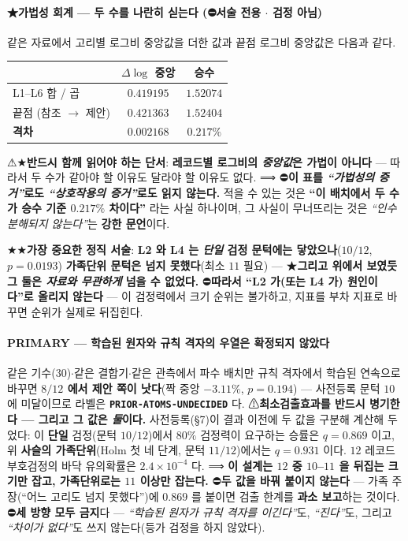 \documentclass[11pt]{report}
\numberwithin{equation}{chapter}
\numberwithin{figure}{chapter}
\numberwithin{table}{chapter}
\begin{document}
\paragraph{★가법성 회계 --- 두 수를 나란히 싣는다 (⛔서술 전용 $\cdot$ 검정 아님)}
같은 자료에서 고리별 로그비 중앙값을 더한 값과 끝점 로그비 중앙값은 다음과 같다.
\begin{center}
\small
\begin{tabular}{lcc}
\toprule
 & $\Delta\log$ 중앙 & 승수 \\
\midrule
L1--L6 합 / 곱 & $0.419195$ & $\mathbf{1.52074}$ \\
끝점 (참조 $\to$ 제안) & $0.421363$ & $\mathbf{1.52404}$ \\
\midrule
\textbf{격차} & $0.002168$ & $\mathbf{0.217\%}$ \\
\bottomrule
\end{tabular}
\end{center}
⚠★\textbf{반드시 함께 읽어야 하는 단서}: \textbf{레코드별 로그비의 \emph{중앙값}은
가법이 아니다} --- 따라서 두 수가 같아야 할 이유도 달라야 할 이유도 없다.
⟹ ⛔\textbf{이 표를 \emph{``가법성의 증거''}로도 \emph{``상호작용의 증거''}로도 읽지
않는다.} 적을 수 있는 것은 \textbf{``이 배치에서 두 수가 승수 기준 $0.217\%$ 차이다''}
라는 사실 하나이며, 그 사실이 무너뜨리는 것은 \emph{``인수분해되지 않는다''}는
\textbf{강한 문언}이다.

★★\textbf{가장 중요한 정직 서술}: \textbf{L2 와 L4 는 \emph{단일} 검정 문턱에는
닿았으나}($10/12$, $p = 0.0193$) \textbf{가족단위 문턱은 넘지 못했다}(최소 $11$ 필요)
--- ★\textbf{그리고 위에서 보였듯 그 둘은 \emph{자료와 무관하게} 넘을 수 없었다.}
⛔\textbf{따라서 ``L2 가(또는 L4 가) 원인이다''로 올리지 않는다} --- 이 검정력에서
크기 순위는 불가하고, 지표를 부차 지표로 바꾸면 순위가 실제로 뒤집힌다.

\paragraph{PRIMARY --- 학습된 원자와 규칙 격자의 우열은 확정되지 않았다}
같은 기수($30$)$\cdot$같은 결합기$\cdot$같은 관측에서 파수 배치만 규칙 격자에서 학습된
연속으로 바꾸면 \textbf{$8/12$ 에서 제안 쪽이 낫다}(짝 중앙 $-3.11\%$, $p = 0.194$)
--- 사전등록 문턱 $10$ 에 미달이므로 라벨은 \textbf{\texttt{PRIOR-ATOMS-UNDECIDED}} 다.
⚠\textbf{최소검출효과를 반드시 병기한다 --- 그리고 그 값은 \emph{둘}이다.}
사전등록(\S 7)이 결과 이전에 두 값을 구분해 계산해 두었다: 이 \textbf{단일} 검정(문턱
$10/12$)에서 $80\%$ 검정력이 요구하는 승률은 \textbf{$q = 0.869$} 이고, 위 \textbf{사슬의
가족단위}(Holm 첫 네 단계, 문턱 $11/12$)에서는 \textbf{$q = 0.931$} 이다.
$12$ 레코드 부호검정의 바닥 유의확률은 $2.4\times10^{-4}$ 다.
⟹ \textbf{이 설계는 $12$ 중 $10$--$11$ 을 뒤집는 크기만 잡고, 가족단위로는 $11$ 이상만 잡는다.}
⛔\textbf{두 값을 바꿔 붙이지 않는다} --- 가족 주장(``어느 고리도 넘지 못했다'')에
$0.869$ 를 붙이면 검출 한계를 \textbf{과소 보고}하는 것이다.
⛔\textbf{세 방향 모두 금지}다 --- \emph{``학습된 원자가 규칙 격자를 이긴다''}도,
\emph{``진다''}도, 그리고 \emph{``차이가 없다''}도 쓰지 않는다(등가 검정을 하지 않았다).
\end{document}

